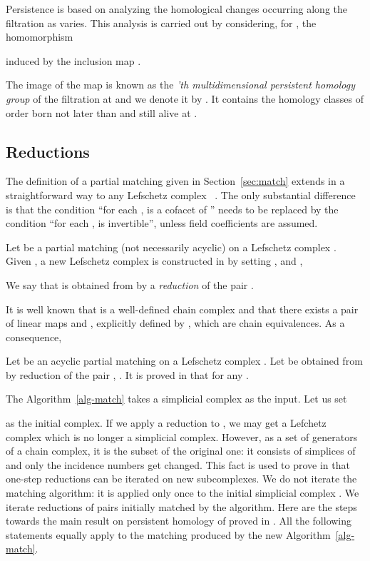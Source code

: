 \documentclass[12pt]{article}
\begin{document}
Persistence is based on analyzing the homological changes occurring along the filtration as  varies. This analysis is carried out by considering, for , the homomorphism

induced by the inclusion map .

The image of the map  is  known as the {\em 'th multidimensional persistent homology group} of the filtration at  and we denote it by . It contains the homology classes of order  born not later than  and still alive at .

\subsection{Reductions}\label{sec:reductions}

The definition of a partial matching given in Section~\ref{sec:match} extends in a straightforward way to any Lefschetz complex ~\cite{AlKaLa17}. The only substantial difference is that the condition ``for each ,  is a cofacet of '' needs to be replaced by the condition ``for each ,  is invertible'', unless field coefficients are assumed.

Let   be a partial matching (not necessarily acyclic) on a Lefschetz complex . Given , a new Lefschetz complex  is constructed in \cite{AlKaLa17} by setting , and ,

We say that  is obtained from  by a {\em reduction} of the pair .

It is well known \cite{KaMrSl98} that  is a well-defined chain complex and that there exists a pair of linear maps  and , explicitly defined by \cite[Formulas (3,4)]{AlKaLa17}, which are chain equivalences. As a consequence,


Let   be an acyclic partial matching  on a Lefschetz complex . Let  be obtained from  by reduction of the pair , . It is proved in \cite{AlKaLa17} that  for any .

The Algorithm~\ref{alg-match} takes a simplicial complex  as the input. Let us set

as the initial complex. If we apply a reduction to , we may get a Lefchetz complex which is no longer a simplicial complex. However, as a set of generators of a chain complex, it is the subset of the original one: it consists of simplices of  and only the incidence numbers get changed. This fact is used to prove in \cite{AlKaLa17} that one-step reductions can be iterated on new subcomplexes. We do not iterate the matching algorithm: it is applied only once to the initial simplicial complex . We iterate reductions of pairs initially matched by the algorithm. Here are the steps towards the main result on persistent homology of  proved in \cite{AlKaLa17}. All the following statements equally apply to the matching produced by the new Algorithm~\ref{alg-match}.
\end{document}
